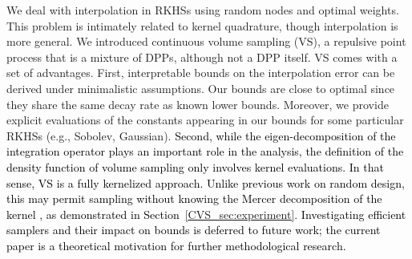 \documentclass[twoside,11pt]{book}
\newcommand{\rev}[1]{\textcolor{black}{#1}}
\numberwithin{theorem}{chapter}
\numberwithin{definition}{chapter}
\numberwithin{proposition}{chapter}
\numberwithin{corollary}{chapter}
\numberwithin{example}{chapter}
\numberwithin{lemma}{chapter}
\numberwithin{assumption}{chapter}
\numberwithin{equation}{chapter}
\numberwithin{figure}{chapter}
\DeclareMathOperator{\X}{\mathcal{X}}
\begin{document}






We deal with interpolation in RKHSs using random nodes and optimal weights. This problem is intimately related to kernel quadrature, though interpolation is more general.
We introduced continuous volume sampling (VS), a repulsive point process that is a mixture of DPPs, although not a DPP itself.
VS comes with a set of advantages. First, interpretable bounds on the interpolation error can be derived under minimalistic assumptions. Our bounds are close to optimal since they share the same decay rate as known lower bounds. Moreover, we provide explicit evaluations of the constants appearing in our bounds for some particular RKHSs (e.g., Sobolev, Gaussian).
\rev{
Second, while the eigen-decomposition of the integration operator plays an important role in the analysis, the definition of the density function of volume sampling only involves kernel evaluations. In that sense, VS is a fully kernelized approach. Unlike previous work on random design, this may permit sampling without knowing the Mercer decomposition of the kernel \parencite{ReGh19}, as demonstrated in Section~\ref{CVS_sec:experiment}. Investigating efficient samplers and their impact on bounds is deferred to future work; the current paper is a theoretical motivation for further methodological research.
}
\end{document}
